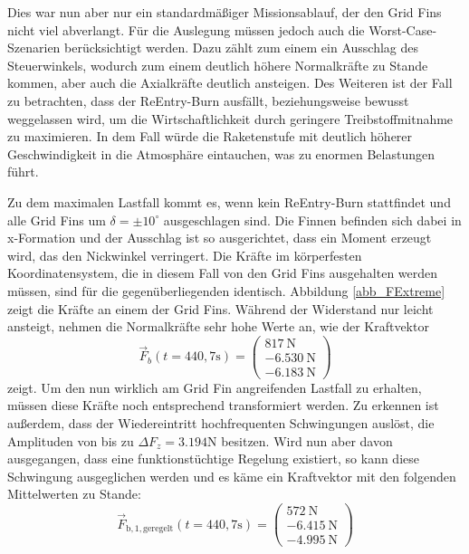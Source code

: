Dies war nun aber nur ein standardmäßiger Missionsablauf, der den Grid Fins nicht viel abverlangt. Für die Auslegung müssen jedoch auch die Worst-Case-Szenarien berücksichtigt werden. Dazu zählt zum einem ein Ausschlag des Steuerwinkels, wodurch zum einem deutlich höhere Normalkräfte zu Stande kommen, aber auch die Axialkräfte deutlich ansteigen. Des Weiteren ist der Fall zu betrachten, dass der ReEntry-Burn ausfällt, beziehungsweise bewusst weggelassen wird, um die Wirtschaftlichkeit durch geringere Treibstoffmitnahme zu maximieren. In dem Fall würde die Raketenstufe mit deutlich höherer Geschwindigkeit in die Atmosphäre eintauchen, was zu enormen Belastungen führt.

Zu dem maximalen Lastfall kommt es, wenn kein ReEntry-Burn stattfindet und alle Grid Fins um $\delta = \pm 10^\circ$ ausgeschlagen sind. Die Finnen befinden sich dabei in x-Formation und der Ausschlag ist so ausgerichtet, dass ein Moment erzeugt wird, das den Nickwinkel verringert. Die Kräfte im körperfesten Koordinatensystem, die in diesem Fall von den Grid Fins ausgehalten werden müssen, sind für die gegenüberliegenden identisch. Abbildung \ref{abb_FExtreme} zeigt die Kräfte an einem der Grid Fins. Während der Widerstand nur leicht ansteigt, nehmen die Normalkräfte sehr hohe Werte an, wie der Kraftvektor
\begin{equation}
	\vec{F}_b(t=440,7\mathrm{s})
	=\left(\begin{array}{r}817\mathrm{\ N}\\-6.530\mathrm{\ N}\\-6.183\mathrm{\ N}\end{array}\right)
\end{equation}
zeigt. Um den nun wirklich am Grid Fin angreifenden Lastfall zu erhalten, müssen diese Kräfte noch entsprechend transformiert werden. Zu erkennen ist außerdem, dass der Wiedereintritt hochfrequenten Schwingungen auslöst, die Amplituden von bis zu $\Delta F_z = 3.194$N besitzen. Wird nun aber davon ausgegangen, dass eine funktionstüchtige Regelung existiert, so kann diese Schwingung ausgeglichen werden und es käme ein Kraftvektor mit den folgenden Mittelwerten zu Stande:
\begin{equation}\label{eq_Fmax}
\vec{F}_\mathrm{b, 1, geregelt}(t=440,7\mathrm{s})
=\left(\begin{array}{r}572\mathrm{\ N}\\-6.415\mathrm{\ N}\\-4.995\mathrm{\ N}\end{array}\right)
\end{equation}
